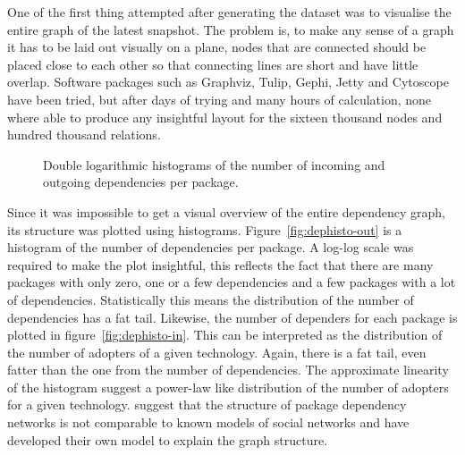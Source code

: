 \documentclass[smallextended,final]{svjour3}
\begin{document}
One of the first thing attempted after generating the dataset was to visualise the entire graph of the latest snapshot. The problem is, to make any sense of a graph it has to be laid out visually on a plane, nodes that are connected should be placed close to each other so that connecting lines are short and have little overlap. Software packages such as Graphviz, Tulip, Gephi, Jetty and Cytoscope have been tried, but after days of trying and many hours of calculation, none where able to produce any insightful layout for the sixteen thousand nodes and hundred thousand relations.

\begin{figure}
\small\centering
{}
\caption{Double logarithmic histograms of the number of incoming and outgoing dependencies per package.}
\end{figure}

Since it was impossible to get a visual overview of the entire dependency graph, its structure was plotted using histograms. Figure~\ref{fig:dephisto-out} is a histogram of the number of dependencies per package. A log-log scale was required to make the plot insightful, this reflects the fact that there are many packages with only zero, one or a few dependencies and a few packages with a lot of dependencies. Statistically this means the distribution of the number of dependencies has a fat tail. Likewise, the number of dependers for each package is plotted in figure~\ref{fig:dephisto-in}. This can be interpreted as the distribution of the number of adopters of a given technology. Again, there is a fat tail, even fatter than the one from the number of dependencies. The approximate linearity of the histogram suggest a power-law like distribution of the number of adopters for a given technology. \citet{zheng08} suggest that the structure of package dependency networks is not comparable to known models of social networks and have developed their own model to explain the graph structure.
\end{document}
